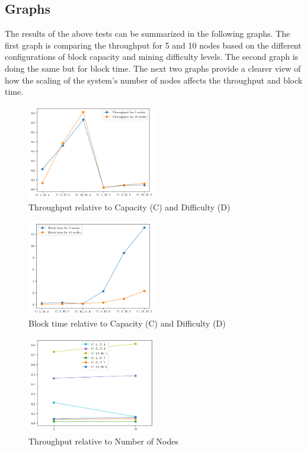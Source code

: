 \documentclass[conference]{IEEEtran}
\begin{document}
\subsection{Graphs}
The results of the above tests can be summarized in the following graphs. The first graph is comparing the throughput for 5 and 10 nodes based on the different configurations of block capacity and mining difficulty levels. The second graph is doing the same but for block time. The next two graphs provide a clearer view of how the scaling of the system's number of nodes affects the throughput and block time.

\begin{figure}[htbp]
\centerline{\includegraphics[width=0.5\textwidth]{throughput-capacity-difficulty.png}}
\caption{Throughput relative to Capacity (C) and Difficulty (D)}
\label{throughput-cd}
\end{figure}

\begin{figure}[htbp]
\centerline{\includegraphics[width=0.5\textwidth]{block-time-capacity-difficulty.png}}
\caption{Block time relative to Capacity (C) and Difficulty (D)}
\label{blocktime-cd}
\end{figure}

\begin{figure}[htbp]
\centerline{\includegraphics[width=0.5\textwidth]{throughput-number-of-nodes.png}}
\caption{Throughput relative to Number of Nodes}
\label{throughput-non}
\end{figure}
\end{document}
